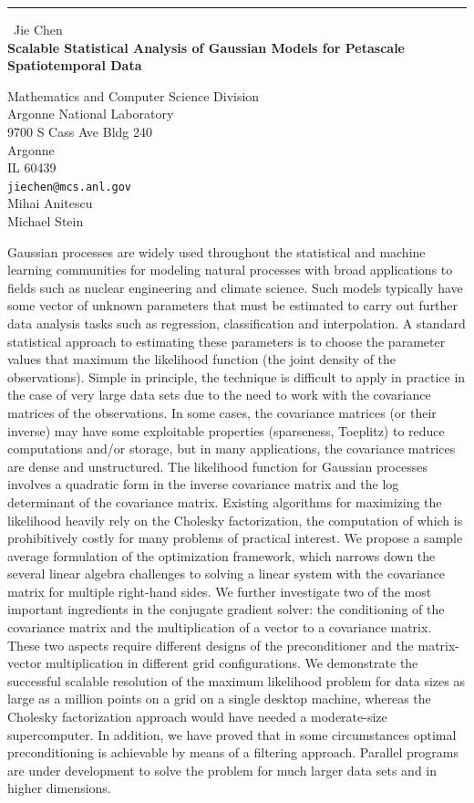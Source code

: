 \documentclass{report}
\begin{document}
\begin{center}
\rule{6in}{1pt} \
{\large Jie Chen \\
{\bf Scalable Statistical Analysis of Gaussian Models for Petascale Spatiotemporal Data}}

Mathematics and Computer Science Division \\ Argonne National Laboratory \\ 9700 S Cass Ave Bldg 240 \\ Argonne \\ IL 60439
\\
{\tt jiechen@mcs.anl.gov}\\
Mihai Anitescu\\
Michael Stein\end{center}

Gaussian processes are widely used throughout the statistical and machine
learning communities for modeling natural processes with broad
applications to fields such as nuclear engineering and climate science.
Such models typically have some vector of unknown parameters that must be
estimated to carry out further data analysis tasks such as regression,
classification and interpolation. A standard statistical approach to
estimating these parameters is to choose the parameter values that
maximum the likelihood function (the joint density of the observations).
Simple in principle, the technique is difficult to apply in practice in
the case of very large data sets due to the need to work with the
covariance matrices of the observations. In some cases, the covariance
matrices (or their inverse) may have some exploitable properties
(sparseness, Toeplitz) to reduce computations and/or storage, but in many
applications, the covariance matrices are dense and unstructured. The
likelihood function for Gaussian processes involves a quadratic form in
the inverse covariance matrix and the log determinant of the covariance
matrix. Existing algorithms for maximizing the likelihood heavily rely on
the Cholesky factorization, the computation of which is prohibitively
costly for many problems of practical interest. We propose a sample
average formulation of the optimization framework, which narrows down the
several linear algebra challenges to solving a linear system with the
covariance matrix for multiple right-hand sides. We further investigate
two of the most important ingredients in the conjugate gradient solver:
the conditioning of the covariance matrix and the multiplication of a
vector to a covariance matrix. These two aspects require different
designs of the preconditioner and the matrix-vector multiplication in
different grid configurations. We demonstrate the successful scalable
resolution of the maximum likelihood problem for data sizes as large as a
million points on a grid on a single desktop machine, whereas the
Cholesky factorization approach would have needed a moderate-size
supercomputer. In addition, we have proved that in some circumstances
optimal preconditioning is achievable by means of a filtering approach.
Parallel programs are under development to solve the problem for much
larger data sets and in higher dimensions.
\end{document}
